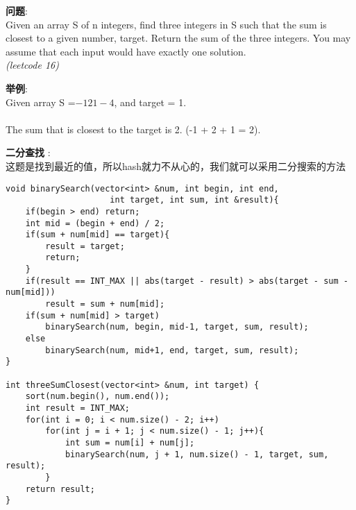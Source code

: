     
\begin{description}
    \item{\textbf{问题}}:\\
Given an array S of n integers, find three integers in S such that the sum is closest to a given number, target. Return the sum of the three integers. You may assume that each input would have exactly one solution. \\
\textit{(leetcode 16)}
    \item{\textbf{举例}}:\\
Given array S =${-1 2 1 -4}$, and target = 1. \\
\\
The sum that is closest to the target is 2. (-1 + 2 + 1 = 2). \\
    \item{\textbf{二分查找}} : 
    \\这题是找到最近的值，所以hash就力不从心的，我们就可以采用二分搜索的方法
    \begin{lstlisting}
void binarySearch(vector<int> &num, int begin, int end,
					 int target, int sum, int &result){
	if(begin > end)	return;
	int mid = (begin + end) / 2;
	if(sum + num[mid] == target){
		result = target;
		return;
	}
	if(result == INT_MAX || abs(target - result) > abs(target - sum - num[mid]))
		result = sum + num[mid];
	if(sum + num[mid] > target)
		binarySearch(num, begin, mid-1, target, sum, result);
	else
		binarySearch(num, mid+1, end, target, sum, result);
}

int threeSumClosest(vector<int> &num, int target) {
	sort(num.begin(), num.end());
	int result = INT_MAX;
	for(int i = 0; i < num.size() - 2; i++)
		for(int j = i + 1; j < num.size() - 1; j++){
			int sum = num[i] + num[j];
			binarySearch(num, j + 1, num.size() - 1, target, sum, result);
		}
	return result;
}
    \end{lstlisting}
\end{description}
